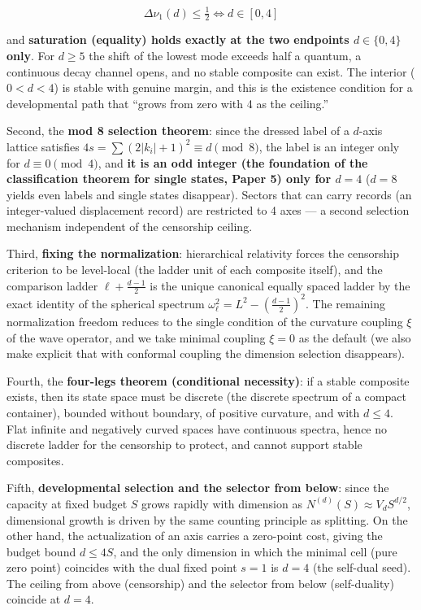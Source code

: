 \documentclass[
]{ltjsarticle}
\begin{document}
\[
\Delta\nu_1(d)\le\tfrac12\iff d\in[0,4]
\]

and \textbf{saturation (equality) holds exactly at the two endpoints
\(d\in\{0,4\}\) only}. For \(d\ge5\) the shift of the lowest mode
exceeds half a quantum, a continuous decay channel opens, and no stable
composite can exist. The interior (\(0<d<4\)) is stable with genuine
margin, and this is the existence condition for a developmental path
that ``grows from zero with 4 as the ceiling.''

Second, the \textbf{mod 8 selection theorem}: since the dressed label of
a \(d\)-axis lattice satisfies \(4s=\sum(2|k_i|+1)^2\equiv d\pmod 8\),
the label is an integer only for \(d\equiv0\pmod4\), and \textbf{it is
an odd integer (the foundation of the classification theorem for single
states, Paper 5) only for \(d=4\)} (\(d=8\) yields even labels and
single states disappear). Sectors that can carry records (an
integer-valued displacement record) are restricted to 4 axes --- a
second selection mechanism independent of the censorship ceiling.

Third, \textbf{fixing the normalization}: hierarchical relativity forces
the censorship criterion to be level-local (the ladder unit of each
composite itself), and the comparison ladder \(\ell+\tfrac{d-1}2\) is
the unique canonical equally spaced ladder by the exact identity of the
spherical spectrum \(\omega_\ell^2=L^2-(\tfrac{d-1}2)^2\). The remaining
normalization freedom reduces to the single condition of the curvature
coupling \(\xi\) of the wave operator, and we take minimal coupling
\(\xi=0\) as the default (we also make explicit that with conformal
coupling the dimension selection disappears).

Fourth, the \textbf{four-legs theorem (conditional necessity)}: if a
stable composite exists, then its state space must be discrete (the
discrete spectrum of a compact container), bounded without boundary, of
positive curvature, and with \(d\le4\). Flat infinite and negatively
curved spaces have continuous spectra, hence no discrete ladder for the
censorship to protect, and cannot support stable composites.

Fifth, \textbf{developmental selection and the selector from below}:
since the capacity at fixed budget \(S\) grows rapidly with dimension as
\(N^{(d)}(S)\approx V_d S^{d/2}\), dimensional growth is driven by the
same counting principle as splitting. On the other hand, the
actualization of an axis carries a zero-point cost, giving the budget
bound \(d\le4S\), and the only dimension in which the minimal cell (pure
zero point) coincides with the dual fixed point \(s=1\) is \(d=4\) (the
self-dual seed). The ceiling from above (censorship) and the selector
from below (self-duality) coincide at \(d=4\).
\end{document}
